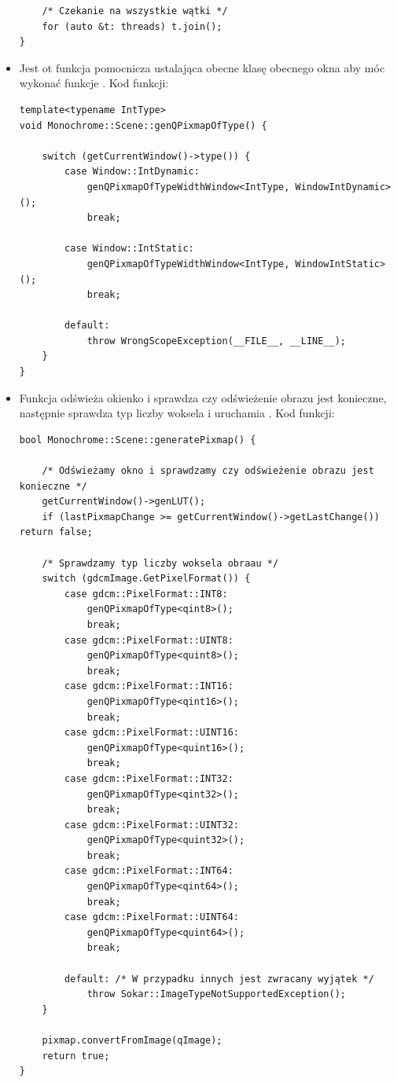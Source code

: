 \begin{itemize}
\begin{lstlisting}
    /* Czekanie na wszystkie wątki */
    for (auto &t: threads) t.join();
}
\end{lstlisting}

    \item {}
 
    Jest ot funkcja pomocnicza ustalająca obecne klasę obecnego okna aby móc wykonać funkcje .
    Kod funkcji:
\begin{lstlisting}
template<typename IntType>
void Monochrome::Scene::genQPixmapOfType() {

    switch (getCurrentWindow()->type()) {
        case Window::IntDynamic:
            genQPixmapOfTypeWidthWindow<IntType, WindowIntDynamic>();
            break;

        case Window::IntStatic:
            genQPixmapOfTypeWidthWindow<IntType, WindowIntStatic>();
            break;

        default:
            throw WrongScopeException(__FILE__, __LINE__);
    }
}
\end{lstlisting}

    \item {}
    
    Funkcja odświeża okienko i sprawdza czy odświeżenie obrazu jest konieczne, następnie sprawdza typ liczby woksela i uruchamia .
    Kod funkcji:
\begin{lstlisting}
bool Monochrome::Scene::generatePixmap() {

    /* Odświeżamy okno i sprawdzamy czy odświeżenie obrazu jest konieczne */
    getCurrentWindow()->genLUT();
    if (lastPixmapChange >= getCurrentWindow()->getLastChange()) return false;

    /* Sprawdzamy typ liczby woksela obraau */
    switch (gdcmImage.GetPixelFormat()) {
        case gdcm::PixelFormat::INT8:
            genQPixmapOfType<qint8>();
            break;
        case gdcm::PixelFormat::UINT8:
            genQPixmapOfType<quint8>();
            break;
        case gdcm::PixelFormat::INT16:
            genQPixmapOfType<qint16>();
            break;
        case gdcm::PixelFormat::UINT16:
            genQPixmapOfType<quint16>();
            break;
        case gdcm::PixelFormat::INT32:
            genQPixmapOfType<qint32>();
            break;
        case gdcm::PixelFormat::UINT32:
            genQPixmapOfType<quint32>();
            break;
        case gdcm::PixelFormat::INT64:
            genQPixmapOfType<qint64>();
            break;
        case gdcm::PixelFormat::UINT64:
            genQPixmapOfType<quint64>();
            break;

        default: /* W przypadku innych jest zwracany wyjątek */
            throw Sokar::ImageTypeNotSupportedException();
    }

    pixmap.convertFromImage(qImage);
    return true;
}
\end{lstlisting}
\end{itemize}


